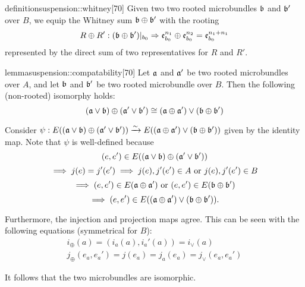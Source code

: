 \begin{mystatement}{definition}{suspension::whitney}[70]
    Given two two rooted microbundles $\bb$ and $\bb'$ over $B$,
    we equip the Whitney sum $\whitney{\bb}{\bb'}$ with the rooting
    \[ \germdef{\whitney{R}{R'}}{(\whitney{\bb}{\bb'})\restr{b_0}}{\whitney{\be[n_1]{b_0}}{\be[n_2]{b_0}} = \be[n_1 + n_1]{b_0}} \]
    represented by the direct sum of two representatives for $R$ and $R'$.
\end{mystatement}

\begin{mystatement}{lemma}{suspension::compatability}[70]
    Let $\mathfrak{a}$ and $\mathfrak{a}'$ be two rooted microbundles over $A$,
    and let $\bb$ and $\bb'$ be two rooted microbundle over $B$.
    Then the following (non-rooted) isomorphy holds:
    \[ \whitney{(\ba \vee \bb)}{(\ba' \vee \bb')} \cong (\whitney{\ba}{\ba'}) \vee (\whitney{\bb}{\bb'}) \]
\end{mystatement}

\begin{myproof}
    Consider $\psi: E(\whitney{(\ba \vee \bb)}{(\ba' \vee \bb')}) \isomto E((\whitney{\ba}{\ba'}) \vee (\whitney{\bb}{\bb'}))$
    given by the identity map.
    Note that $\psi$ is well-defined because
    \[ (e, e') \in E(\whitney{(\ba \vee \bb)}{(\ba' \vee \bb')}) \]
    \[ \implies j(e) = j'(e') \implies j(e), j'(e') \in A \text{ or } j(e), j'(e') \in B\]
    \[ \implies (e, e') \in E(\whitney{\ba}{\ba'}) \tor (e, e') \in E(\whitney{\bb}{\bb'}) \]
    \[ \implies (e, e') \in E((\whitney{\ba}{\ba'}) \vee (\whitney{\bb}{\bb'})). \]

    Furthermore, the injection and projection maps agree.
    This can be seen with the following equations (symmetrical for $B$):
    \begin{gather}
        i_\oplus(a) = (i_a(a), i_a'(a)) = i_\vee(a) \\
        j_\oplus(e_a, e_a') = j(e_a) = j_a(e_a) =  j_\vee(e_a, e_a')
    \end{gather}

    It follows that the two microbundles are isomorphic.
\end{myproof}